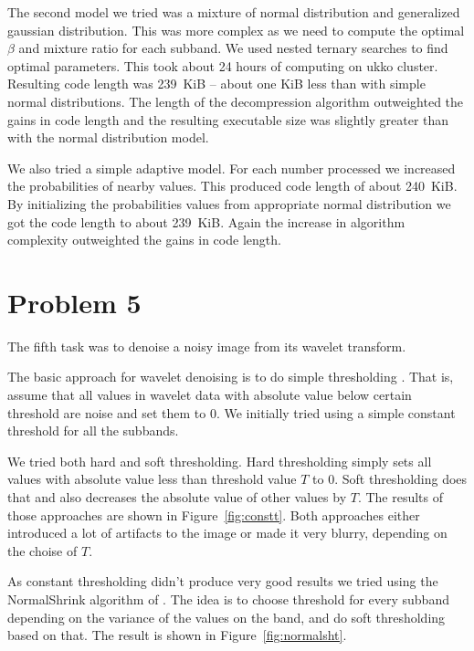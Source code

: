 \documentclass{article}
\begin{document}
The second model we tried was a mixture of normal distribution and generalized gaussian distribution. This was more complex
as we need to compute the optimal $\beta$ and mixture ratio for each subband. We used nested ternary searches to find optimal parameters.
This took about 24 hours of computing on ukko cluster. Resulting code length was 239~KiB -- about one KiB less than with simple normal distributions.
The length of the decompression algorithm outweighted the gains in code length and the resulting executable size was slightly
greater than with the normal distribution model.

We also tried a simple adaptive model.
For each number processed we increased the probabilities of nearby values.
This produced code length of about 240~KiB.
By initializing the probabilities values from appropriate normal distribution we got the code length to about 239~KiB.
Again the increase in algorithm complexity outweighted the gains in code length.

\section{Problem 5}

The fifth task was to denoise a noisy image from its wavelet transform.

The basic approach for wavelet denoising is to do simple thresholding \cite{rvs02}. That is, assume that all values in wavelet data with absolute value below certain threshold are noise and set them to 0. We initially tried using a simple constant threshold for all the subbands.

We tried both hard and soft thresholding. Hard thresholding simply sets all values with absolute value less than threshold value $T$ to 0. Soft thresholding does that and also decreases the absolute value of other values by $T$. The results of those approaches are shown in Figure~\ref{fig:constt}. Both approaches either introduced a lot of artifacts to the image or made it very blurry, depending on the choise of $T$.

As constant thresholding didn't produce very good results we tried using the NormalShrink algorithm of \cite{ksc02}. The idea is to choose threshold for every subband depending on the variance of the values on the band, and do soft thresholding based on that. The result is shown in Figure~\ref{fig:normalsht}.
\end{document}
